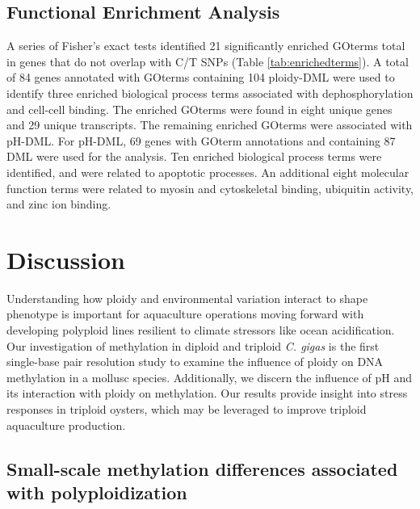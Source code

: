 \documentclass [11pt, proquest] {uwthesis}[2015/03/03]
\begin{document}
\hypertarget{functional-enrichment-analysis-1}{%
\subsection{Functional Enrichment Analysis}\label{functional-enrichment-analysis-1}}

A series of Fisher's exact tests identified 21 significantly enriched GOterms total in genes that do not overlap with C/T SNPs (Table \ref{tab:enrichedterms}). A total of 84 genes annotated with GOterms containing 104 ploidy-DML were used to identify three enriched biological process terms associated with dephosphorylation and cell-cell binding. The enriched GOterms were found in eight unique genes and 29 unique transcripts. The remaining enriched GOterms were associated with pH-DML. For pH-DML, 69 genes with GOterm annotations and containing 87 DML were used for the analysis. Ten enriched biological process terms were identified, and were related to apoptotic processes. An additional eight molecular function terms were related to myosin and cytoskeletal binding, ubiquitin activity, and zinc ion binding.

\hypertarget{discussion-3}{%
\section{Discussion}\label{discussion-3}}

Understanding how ploidy and environmental variation interact to shape phenotype is important for aquaculture operations moving forward with developing polyploid lines resilient to climate stressors like ocean acidification. Our investigation of methylation in diploid and triploid \emph{C. gigas} is the first single-base pair resolution study to examine the influence of ploidy on DNA methylation in a mollusc species. Additionally, we discern the influence of pH and its interaction with ploidy on methylation. Our results provide insight into stress responses in triploid oysters, which may be leveraged to improve triploid aquaculture production.

\hypertarget{small-scale-methylation-differences-associated-with-polyploidization}{%
\subsection{Small-scale methylation differences associated with polyploidization}\label{small-scale-methylation-differences-associated-with-polyploidization}}
\end{document}
